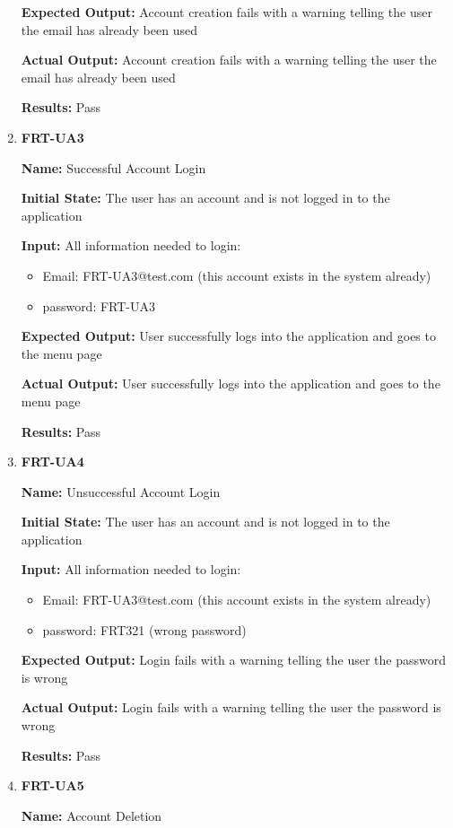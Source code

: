 \documentclass[12pt, titlepage]{article}
\begin{document}
\begin{enumerate}
\textbf{Expected Output:} Account creation fails with a warning telling the user the email has already been used

\textbf{Actual Output:} Account creation fails with a warning telling the user the email has already been used

\textbf{Results:} Pass

\item \textbf{FRT-UA3}

\textbf{Name:} Successful Account Login

\textbf{Initial State:} The user has an account and is not logged in to the application

\textbf{Input:} All information needed to login:
\begin{itemize}
\item Email: FRT-UA3@test.com (this account exists in the system already)
\item password: FRT-UA3
\end{itemize}
					
\textbf{Expected Output:} User successfully logs into the application and goes to the menu page

\textbf{Actual Output:} User successfully logs into the application and goes to the menu page

\textbf{Results:} Pass

\item \textbf{FRT-UA4}

\textbf{Name:} Unsuccessful Account Login

\textbf{Initial State:} The user has an account and is not logged in to the application

\textbf{Input:} All information needed to login:
\begin{itemize}
\item Email: FRT-UA3@test.com (this account exists in the system already)
\item password: FRT321 (wrong password)
\end{itemize}
					
\textbf{Expected Output:} Login fails with a warning telling the user the password is wrong

\textbf{Actual Output:} Login fails with a warning telling the user the password is wrong

\textbf{Results:} Pass

\item \textbf{FRT-UA5}

\textbf{Name:} Account Deletion


\end{enumerate}
\end{document}
